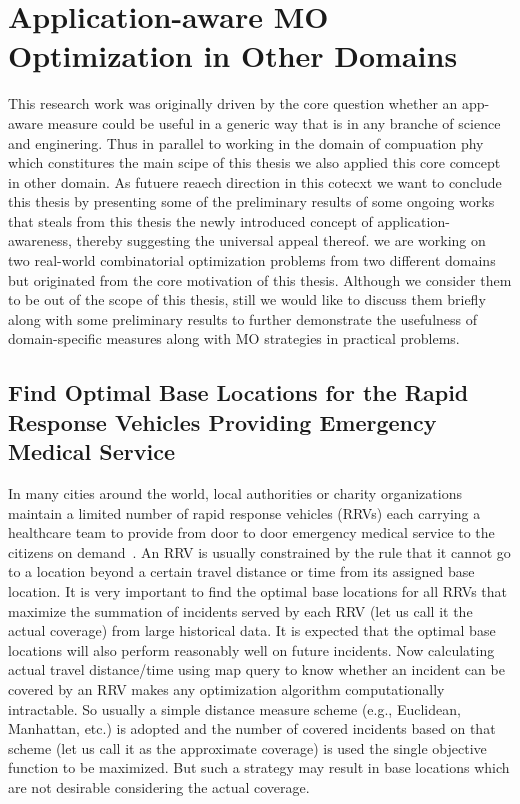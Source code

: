 \section{Application-aware MO Optimization in Other Domains}
This research work was originally driven by the core question whether an app-aware measure could be useful in a generic way that is in any branche of science and enginering. Thus in parallel to working in the domain of compuation phy which constitures the main scipe of this thesis we also applied this core comcept in other domain. 
As futuere reaech direction in this cotecxt we want to conclude this thesis by presenting some of the preliminary results of some ongoing works that steals from this thesis the newly introduced concept of application-awareness, thereby suggesting the universal appeal thereof.
 we are working on two real-world combinatorial optimization problems from two different domains but originated from the core motivation of this thesis. Although we consider them to be out of the scope of this thesis, still we would like to discuss them briefly along with some preliminary results to further demonstrate the usefulness of domain-specific measures along with MO strategies in practical problems. 

\subsection{Find Optimal Base Locations for the Rapid Response Vehicles Providing Emergency Medical Service}
In many cities around the world, local authorities or charity organizations maintain a limited number of rapid response vehicles (RRVs) each carrying a healthcare team to provide from door to door emergency medical service to the citizens on demand~\cite{roislien2018comparing, van2019improving, benabdouallah2017comparison}. An RRV is usually constrained by the rule that it cannot go to a location beyond a certain travel distance or time from its assigned base location. It is very important to find the optimal base locations for all RRVs that maximize the summation of incidents served by each RRV (let us call it the actual coverage) from large historical data. It is expected that the optimal base locations will also perform reasonably well on future incidents. Now calculating actual travel distance/time using map query to know whether an incident can be covered by an RRV makes any optimization algorithm computationally intractable. So usually a simple distance measure scheme (e.g., Euclidean, Manhattan, etc.) is adopted and the number of covered incidents based on that scheme (let us call it as the approximate coverage) is used the single objective function to be maximized. But such a strategy may result in base locations which are not desirable considering the actual coverage.

